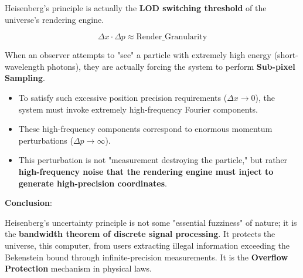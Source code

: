 Heisenberg's principle is actually the \textbf{LOD switching threshold} of the universe's rendering engine.

\begin{equation}
\Delta x \cdot \Delta p \approx \text{Render\_Granularity}
\end{equation}

When an observer attempts to "see" a particle with extremely high energy (short-wavelength photons), they are actually forcing the system to perform \textbf{Sub-pixel Sampling}.

\begin{itemize}
\item To satisfy such excessive position precision requirements ($\Delta x \to 0$), the system must invoke extremely high-frequency Fourier components.

\item These high-frequency components correspond to enormous momentum perturbations ($\Delta p \to \infty$).

\item This perturbation is not "measurement destroying the particle," but rather \textbf{high-frequency noise that the rendering engine must inject to generate high-precision coordinates}.
\end{itemize}

\textbf{Conclusion}:

Heisenberg's uncertainty principle is not some "essential fuzziness" of nature; it is the \textbf{bandwidth theorem of discrete signal processing}. It protects the universe, this computer, from users extracting illegal information exceeding the Bekenstein bound through infinite-precision measurements. It is the \textbf{Overflow Protection} mechanism in physical laws.

